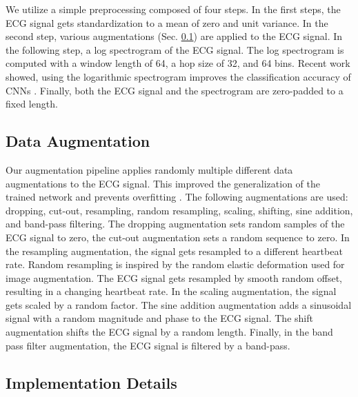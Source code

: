 We utilize a simple preprocessing composed of four steps. In the first steps, the ECG signal gets standardization to a mean of zero and unit variance. In the second step, various augmentations (Sec. \ref{subsec:data_augmentation}) are applied to the ECG signal. In the following step, a log spectrogram of the ECG signal. The log spectrogram is computed with a window length of 64, a hop size of 32, and 64 bins. Recent work showed, using the logarithmic spectrogram improves the classification accuracy of CNNs \cite{Zihlmann2017}. Finally, both the ECG signal and the spectrogram are zero-padded to a fixed length.

\subsection{Data Augmentation} \label{subsec:data_augmentation}

Our augmentation pipeline applies randomly multiple different data augmentations to the ECG signal. This improved the generalization of the trained network and prevents overfitting \cite{Perez2017, Nonaka2020, Hatamian2020}. The following augmentations are used: dropping, cut-out, resampling, random resampling, scaling, shifting, sine addition, and band-pass filtering. The dropping augmentation sets random samples of the ECG signal to zero, the cut-out augmentation sets a random sequence to zero. In the resampling augmentation, the signal gets resampled to a different heartbeat rate. Random resampling is inspired by the random elastic deformation \cite{Simard2003, Ronneberger2015, Reich2020a} used for image augmentation. The ECG signal gets resampled by smooth random offset, resulting in a changing heartbeat rate. In the scaling augmentation, the signal gets scaled by a random factor. The sine addition augmentation adds a sinusoidal signal with a random magnitude and phase to the ECG signal. The shift augmentation shifts the ECG signal by a random length. Finally, in the band pass filter augmentation, the ECG signal is filtered by a band-pass.

\subsection{Implementation Details} \label{subsec:implementation}

